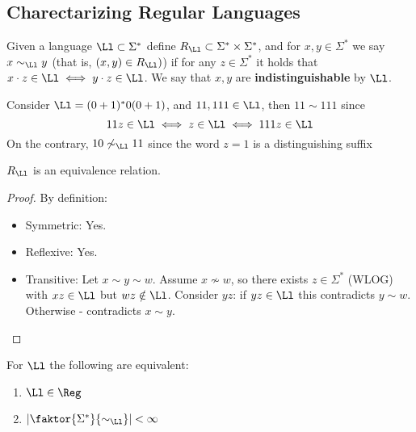 \subsection{Charectarizing Regular Languages}
\begin{yellowBox}
	\begin{defn}
		[Indistinguishable by \Ll]Given a language $\Ll\subset \Sigma^*$ define $R_{\Ll}\subset \Sigma^*\times \Sigma^*$, and for $x,y\in \Sigma^*$ we say $x\sim_{\Ll} y$ (that is, $(x,y)\in R_{\Ll})$) if for any $z\in \Sigma^*$ it holds that $x\cdot z \in \Ll \iff y\cdot z\in \Ll$. We say that $x,y$ are \textbf{indistinguishable} by $\Ll$.
	\end{defn}
\end{yellowBox}
\begin{example}
	Consider $\Ll = (0+1)^*0(0+1)$, and $11,111\in \Ll$, then $11\sim 111$ since\[
	11z\in \Ll \iff z\in \Ll \iff 111z\in \Ll
	\]
	On the contrary, $10\not\sim_{\Ll} 11$ since the word $z = 1$ is a distinguishing suffix
\end{example}
\begin{claim}
	$R_{\Ll}$ is an equivalence relation.
\end{claim}
\begin{proof} By definition:
	\begin{itemize}
		\item Symmetric: Yes.
		\item Reflexive: Yes.
		\item Transitive: Let $x\sim y \sim w$. Assume $x\not\sim w$, so there exists $z\in \Sigma^*$ (WLOG) with $xz\in \Ll$ but $wz\notin \Ll$. Consider $yz$: if $yz\in \Ll$ this contradicts $y\sim w$. Otherwise - contradicts $x\sim y$.
	\end{itemize}
\end{proof}
\begin{blueBox}
	\begin{thm}
		 For $\Ll$ the following are equivalent:
		\begin{enumerate}
			\item $\Ll\in \Reg$
			\item $\left|\faktor{\Sigma^*}{\sim_{\Ll}}\right| < \infty$
		\end{enumerate}
	\end{thm}
\end{blueBox}
